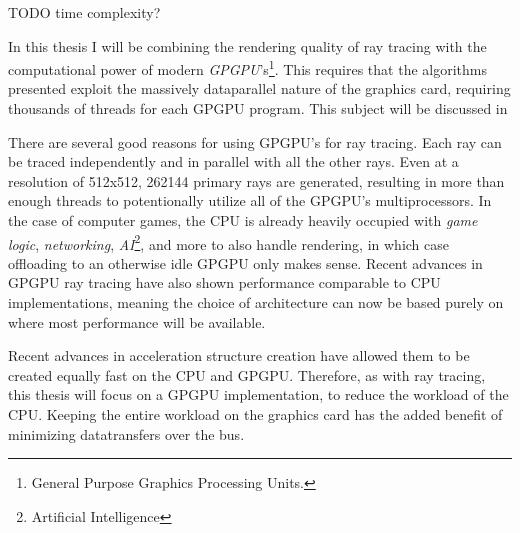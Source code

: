 
TODO time complexity?


In this thesis I will be combining the rendering quality of ray
tracing with the computational power of modern
\textit{GPGPU}'s\footnote{General Purpose Graphics Processing
  Units.}. This requires that the algorithms presented exploit the
massively dataparallel nature of the graphics card, requiring
thousands of threads for each GPGPU program. This subject will be
discussed in 

There are several good reasons for using GPGPU's for ray tracing. Each
ray can be traced independently and in parallel with all the other
rays. Even at a resolution of 512x512, 262144 primary rays are
generated, resulting in more than enough threads to potentionally
utilize all of the GPGPU's multiprocessors. In the case of computer
games, the CPU is already heavily occupied with \textit{game logic},
\textit{networking}, \textit{AI}\footnote{Artificial Intelligence},
and more to also handle rendering, in which case offloading to an
otherwise idle GPGPU only makes sense. Recent advances in GPGPU ray
tracing have also shown performance comparable to CPU
implementations, meaning
the choice of architecture can now be based purely on where most
performance will be available.

Recent advances in acceleration structure creation have allowed them
to be created equally fast on the CPU and
GPGPU. Therefore, as with ray tracing, this thesis
will focus on a GPGPU implementation, to reduce the workload of the
CPU. Keeping the entire workload on the graphics card has the added
benefit of minimizing datatransfers over the bus.




